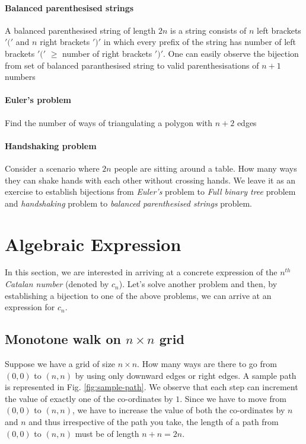 \paragraph{Balanced parenthesised strings} A balanced parenthesised string of length $2n$ is a string consists of $n$ left brackets $'('$ and $n$ right brackets $')'$ in which every prefix of the string has number of left brackets $'('$ $\geq$ number of right brackets $')'$. One can easily observe the bijection from set of balanced paranthesised string to valid parenthesisations of $n+1$ numbers

\paragraph{Euler's problem} Find the number of ways of triangulating a polygon with $n+2$ edges

\paragraph{Handshaking problem} Consider a scenario where $2n$ people are sitting around a table. How many ways they can shake hands with each other without crossing hands. We leave it as an exercise to establish bijections from \emph{Euler's} problem to \emph{Full binary tree} problem and \emph{handshaking} problem to \emph{balanced parenthesised strings} problem.

\section{Algebraic Expression}
In this section, we are interested in arriving at a concrete expression of the $n^{th}$ \emph{Catalan number} (denoted by $c_n$). Let's solve another problem and then, by establishing a bijection to one of the above problems, we can arrive at an expression for $c_n$.

\subsection{Monotone walk on $n\times n$ grid} Suppose we have a grid of size $n\times n$. How many ways are there to go from $(0,0)$ to $(n,n)$ by using only downward edges or right edges. A sample path is represented in Fig. \ref{fig:sample-path}. We observe that each step can increment the value of exactly one of the co-ordinates by $1$. Since we have to move from $(0,0)$ to $(n,n)$, we have to increase the value of both the co-ordinates by $n$ and $n$ and thus irrespective of the path you take, the length of a path from $(0,0)$ to $(n,n)$ must be of length $n+n=2n$.

